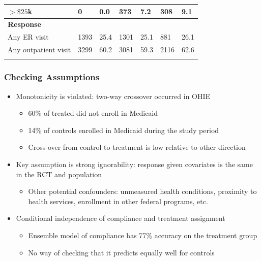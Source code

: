 \documentclass{beamer}
\begin{document}
\begin{frame}
{\begin{singlespace}
\begin{landscape}
\begin{longtable}{lllllll}
\hspace{3mm} $>\$25$k & 0 & 0.0 & 373 & 7.2 & 308 & 9.1 \\
   \hline
\hline
 \textbf{Response} &   &  &  & &  &  \\ 
\hspace{3mm}Any ER visit &  1393 & 25.4 & 1301 & 25.1 & 881 & 26.1 \\ 
\hspace{3mm}Any outpatient visit & 3299 & 60.2 & 3081 & 59.3 & 2116 & 62.6 \\ 
\hline
\hline
\label{rct-nrt-compare}
\end{longtable}
\end{landscape}
\end{singlespace}
}
\end{frame}

\begin{frame}
\frametitle{Checking Assumptions} 
\begin{itemize}
\item Monotonicity is violated: two-way crossover occurred in OHIE
\begin{itemize}
\item 60\% of treated did not enroll in Medicaid 
\item 14\% of controls enrolled in Medicaid during the study period
\item Cross-over from control to treatment is low relative to other direction
\end{itemize}
\item Key assumption is strong ignorability: response given covariates is the same in the RCT and population
\begin{itemize}
\item Other potential confounders: unmeasured health conditions, proximity to health services, enrollment in other federal programs, etc.
\end{itemize}
\item Conditional independence of compliance and treatment assignment
\begin{itemize}
\item Ensemble model of compliance has 77\% accuracy on the treatment group
\item No way of checking that it predicts equally well for controls
\end{itemize}
\end{itemize}
\end{frame}
\end{document}
